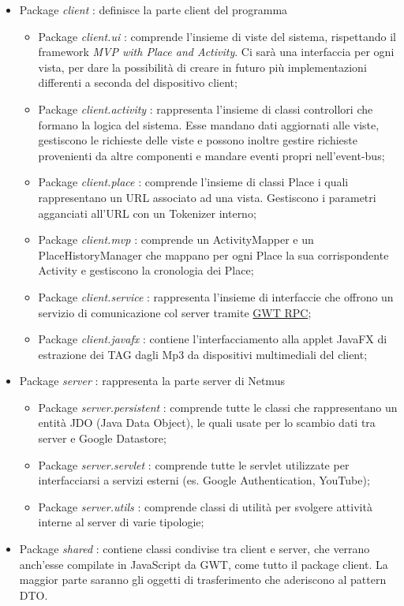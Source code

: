 \begin{itemize}
  \item Package \emph{client} : definisce la parte client del programma
  \begin {itemize}
    \item Package \emph{client.ui} : comprende l'insieme di viste del sistema,
    rispettando il framework \emph{MVP with Place and Activity}. Ci sar\`a una
    interfaccia per ogni vista, per dare la possibilit\`a di creare in futuro
    pi\`u implementazioni differenti a seconda del dispositivo client;
    \item Package \emph{client.activity} : rappresenta l'insieme di classi
    controllori che formano la logica del sistema. Esse mandano dati aggiornati alle
    viste, gestiscono le richieste delle viste e possono inoltre gestire
    richieste provenienti da altre componenti e mandare eventi propri nell'event-bus;
    \item Package \emph{client.place} : comprende l'insieme di classi Place i
    quali rappresentano un URL associato ad una vista. Gestiscono i parametri
    agganciati all'URL con un Tokenizer interno;
    \item Package \emph{client.mvp} : comprende un ActivityMapper e
    un PlaceHistoryManager che mappano per ogni Place la sua corrispondente
    Activity e gestiscono la cronologia dei Place;
    \item Package \emph{client.service} : rappresenta l'insieme di interfaccie
    che offrono un servizio di comunicazione col server tramite \underline{GWT
    RPC};
    \item Package \emph{client.javafx} : contiene l'interfacciamento alla
    applet JavaFX di estrazione dei TAG dagli Mp3 da dispositivi multimediali del client;
  \end {itemize}
  \item Package \emph{server} : rappresenta la parte server di Netmus
  \begin{itemize}
    \item Package \emph{server.persistent} : comprende tutte le classi che
    rappresentano un entit\`a JDO (Java Data Object), le quali usate per lo scambio dati tra
    server e Google Datastore;
    \item Package \emph{server.servlet} : comprende tutte le servlet utilizzate
    per interfacciarsi a servizi esterni (es. Google Authentication, YouTube);
    \item Package \emph{server.utils} : comprende classi di utilit\`a per
    svolgere attivit\`a interne al server di varie tipologie;
  \end{itemize}
  \item Package \emph{shared} :  contiene classi condivise tra client e server,
  che verrano anch'esse compilate in JavaScript da GWT, come tutto il package
  client. La maggior parte saranno gli oggetti di trasferimento che
  aderiscono al pattern DTO.
\end{itemize}

